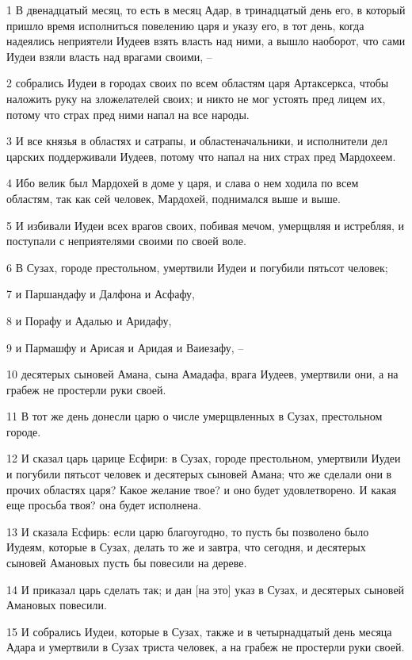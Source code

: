 \par 1 В двенадцатый месяц, то есть в месяц Адар, в тринадцатый день его, в который пришло время исполниться повелению царя и указу его, в тот день, когда надеялись неприятели Иудеев взять власть над ними, а вышло наоборот, что сами Иудеи взяли власть над врагами своими, --
\par 2 собрались Иудеи в городах своих по всем областям царя Артаксеркса, чтобы наложить руку на зложелателей своих; и никто не мог устоять пред лицем их, потому что страх пред ними напал на все народы.
\par 3 И все князья в областях и сатрапы, и областеначальники, и исполнители дел царских поддерживали Иудеев, потому что напал на них страх пред Мардохеем.
\par 4 Ибо велик был Мардохей в доме у царя, и слава о нем ходила по всем областям, так как сей человек, Мардохей, поднимался выше и выше.
\par 5 И избивали Иудеи всех врагов своих, побивая мечом, умерщвляя и истребляя, и поступали с неприятелями своими по своей воле.
\par 6 В Сузах, городе престольном, умертвили Иудеи и погубили пятьсот человек;
\par 7 и Паршандафу и Далфона и Асфафу,
\par 8 и Порафу и Адалью и Аридафу,
\par 9 и Пармашфу и Арисая и Аридая и Ваиезафу, --
\par 10 десятерых сыновей Амана, сына Амадафа, врага Иудеев, умертвили они, а на грабеж не простерли руки своей.
\par 11 В тот же день донесли царю о числе умерщвленных в Сузах, престольном городе.
\par 12 И сказал царь царице Есфири: в Сузах, городе престольном, умертвили Иудеи и погубили пятьсот человек и десятерых сыновей Амана; что же сделали они в прочих областях царя? Какое желание твое? и оно будет удовлетворено. И какая еще просьба твоя? она будет исполнена.
\par 13 И сказала Есфирь: если царю благоугодно, то пусть бы позволено было Иудеям, которые в Сузах, делать то же и завтра, что сегодня, и десятерых сыновей Амановых пусть бы повесили на дереве.
\par 14 И приказал царь сделать так; и дан [на это] указ в Сузах, и десятерых сыновей Амановых повесили.
\par 15 И собрались Иудеи, которые в Сузах, также и в четырнадцатый день месяца Адара и умертвили в Сузах триста человек, а на грабеж не простерли руки своей.
